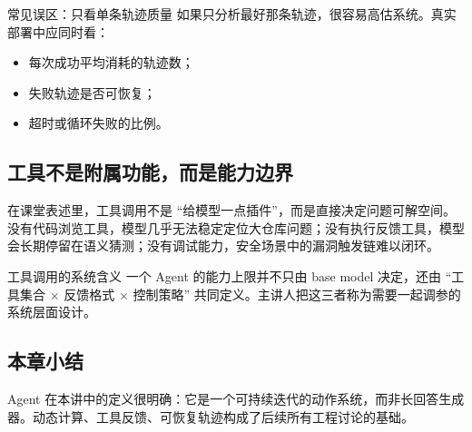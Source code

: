 \begin{warningbox}{常见误区：只看单条轨迹质量}
如果只分析最好那条轨迹，很容易高估系统。真实部署中应同时看：
\begin{itemize}
    \item 每次成功平均消耗的轨迹数；
    \item 失败轨迹是否可恢复；
    \item 超时或循环失败的比例。
\end{itemize}
\end{warningbox}

\subsection{工具不是附属功能，而是能力边界}
在课堂表述里，工具调用不是 ``给模型一点插件''，而是直接决定问题可解空间。没有代码浏览工具，模型几乎无法稳定定位大仓库问题；没有执行反馈工具，模型会长期停留在语义猜测；没有调试能力，安全场景中的漏洞触发链难以闭环。

\begin{importantbox}{工具调用的系统含义}
一个 Agent 的能力上限并不只由 base model 决定，还由 ``工具集合 $\times$ 反馈格式 $\times$ 控制策略'' 共同定义。主讲人把这三者称为需要一起调参的系统层面设计。
\end{importantbox}

\subsection{本章小结}
Agent 在本讲中的定义很明确：它是一个可持续迭代的动作系统，而非长回答生成器。动态计算、工具反馈、可恢复轨迹构成了后续所有工程讨论的基础。

